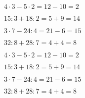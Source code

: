 \begin{alist}
\item $ 4\cdot 3-5\cdot 2=12-10=2 $
\item $ 15:3+18:2=5+9=14 $
\item $ 3\cdot 7-24:4=21-6=15 $
\item $ 32:8+28:7=4+4=8 $
\end{alist}
\begin{alist}
\item $ 4\cdot 3-5\cdot 2=12-10=2 $
\item $ 15:3+18:2=5+9=14 $
\item $ 3\cdot 7-24:4=21-6=15 $
\item $ 32:8+28:7=4+4=8 $
\end{alist}

